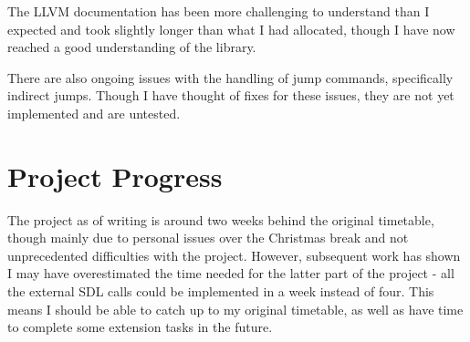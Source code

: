 \documentclass[12pt,a4paper,twoside]{article}
\begin{document}
The LLVM documentation has been more challenging to understand than I expected and took slightly longer than what I had allocated, though I have now reached a good understanding of the library.

There are also ongoing issues with the handling of jump commands, specifically indirect jumps. Though I have thought of fixes for these issues, they are not yet implemented and are untested.


\section*{Project Progress}
The project as of writing is around two weeks behind the original timetable, though mainly due to personal issues over the Christmas break and not unprecedented difficulties with the project. However, subsequent work has shown I may have overestimated the time needed for the latter part of the project - all the external SDL calls could be implemented in a week instead of four. This means I should be able to catch up to my original timetable, as well as have time to complete some extension tasks in the future.
\end{document}
